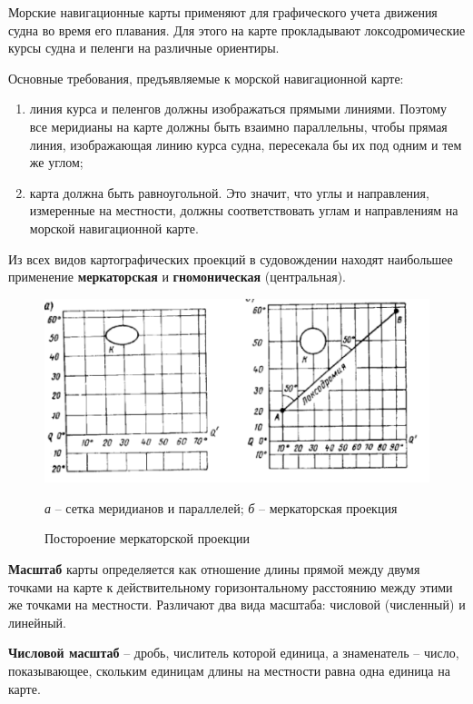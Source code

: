\documentclass[a4paper, 12pt, twoside, final, book, russian, fittopage, cyremdash]{ncc}
\begin{document}
Морские навигационные карты применяют для графического учета движения судна во время его плавания. Для этого на карте прокладывают локсодромические курсы судна и пеленги на различные ориентиры. 

Основные требования, предъявляемые к морской навигационной карте: 

\begin{enumerate}
\item линия курса и пеленгов должны изображаться прямыми линиями. Поэтому все меридианы на карте должны быть взаимно параллельны, чтобы прямая линия, изображающая линию курса судна, пересекала бы их под одним и тем же углом; 
\item карта должна быть равноугольной. Это значит, что углы и направления, измеренные на местности, должны соответствовать углам и направлениям на морской навигационной карте. 
\end{enumerate}

Из всех видов картографических проекций в судовождении находят наибольшее применение \textbf{меркаторская} и \textbf{гномоническая} (центральная). 

\begin{figure}[htb]
  \centering{}
  \includegraphics{N028}
  \caption{Постороение меркаторской проекции}
  \label{fig:N28}
  \small
  \centering{}
  \textit{а} \--- сетка меридианов и параллелей; \textit{б} \--- меркаторская проекция
\end{figure}

\textbf{Масштаб} карты определяется как отношение длины прямой между двумя точками на карте к действительному горизонтальному расстоянию между этими же точками на местности. Различают два вида масштаба: числовой (численный) и линейный.
 
\textbf{Числовой масштаб} \--- дробь, числитель которой единица, а знаменатель \--- число, показывающее, скольким единицам длины на местности равна одна единица на карте. 
\end{document}

